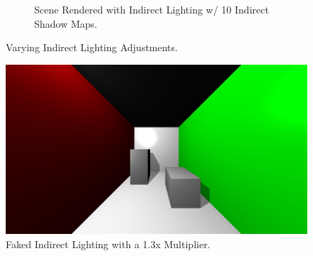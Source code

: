 \begin{figure}
\begin{subfigure}[b]{0.75\textwidth}
                \caption{Scene Rendered with Indirect Lighting w/ 10 Indirect Shadow Maps.}
                \label{fig:10indSM}
        \end{subfigure}
        \caption{Varying Indirect Lighting Adjustments.} \label{fig:indirectimages}
\end{figure}


\begin{figure}[h!]
  \centering
    \includegraphics[width=1.0\textwidth]{direct_only_fake_1_3.jpg}
  \caption{Faked Indirect Lighting with a 1.3x Multiplier.}
	\label{fig:fakedindirect}
\end{figure}


